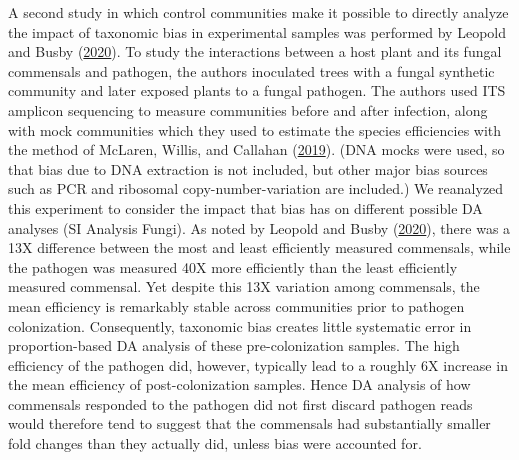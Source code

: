 \documentclass[
]{article}
\begin{document}
A second study in which control communities make it possible to directly analyze the impact of taxonomic bias in experimental samples was performed by Leopold and Busby (\protect\hyperlink{ref-leopold2020host}{2020}).
To study the interactions between a host plant and its fungal commensals and pathogen, the authors inoculated trees with a fungal synthetic community and later exposed plants to a fungal pathogen.
The authors used ITS amplicon sequencing to measure communities before and after infection, along with mock communities which they used to estimate the species efficiencies with the method of McLaren, Willis, and Callahan (\protect\hyperlink{ref-mclaren2019cons}{2019}).
(DNA mocks were used, so that bias due to DNA extraction is not included, but other major bias sources such as PCR and ribosomal copy-number-variation are included.)
We reanalyzed this experiment to consider the impact that bias has on different possible DA analyses (SI Analysis Fungi).
As noted by Leopold and Busby (\protect\hyperlink{ref-leopold2020host}{2020}), there was a 13X difference between the most and least efficiently measured commensals, while the pathogen was measured 40X more efficiently than the least efficiently measured commensal.
Yet despite this 13X variation among commensals, the mean efficiency is remarkably stable across communities prior to pathogen colonization.
Consequently, taxonomic bias creates little systematic error in proportion-based DA analysis of these pre-colonization samples.
The high efficiency of the pathogen did, however, typically lead to a roughly 6X increase in the mean efficiency of post-colonization samples.
Hence DA analysis of how commensals responded to the pathogen did not first discard pathogen reads would therefore tend to suggest that the commensals had substantially smaller fold changes than they actually did, unless bias were accounted for.
\end{document}
